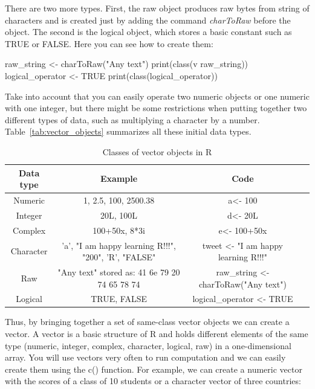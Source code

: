 There are two more types. First, the raw object produces raw bytes from string of characters and is created just by adding the command \emph{charToRaw} before the object. The second is the logical object, which stores a basic constant such as TRUE or FALSE. Here you can see how to create them:

\begin{exampler}
raw_string <- charToRaw("Any text")
print(class(v raw_string))
logical_operator <- TRUE 
print(class(logical_operator))
\end{exampler}

Take into account that you can easily operate two numeric objects or one numeric with one integer, but there might be some restrictions when putting together two different types of data, such as multiplying a character by a number. Table~\ref{tab:vector_objects} summarizes all these initial data types.

\begin{table}[ht]
\label{tab:vector_objects}
\caption{Classes of vector objects in R}
\centering
\begin{tabular}{c c c p{2cm}}
\hline\hline
Data type & Example & Code \\ [0.5ex]
\hline
Numeric&1, 2.5, 100, 2500.38& a\textless- 100 \\
Integer&20L, 100L&d\textless- 20L \\
Complex& 100+50x, 8*3i &e\textless- 100+50x \\
Character&   \parbox[t]{4cm}{\centering 'a', "I am happy learning R!!!", "200", 'R', "FALSE"} & tweet \textless- "I am happy learning R!!!" \\
Raw& \parbox[t]{4cm}{\centering "Any text" stored as:  41 6e 79 20 74 65 78 74} & raw\_string \textless- charToRaw("Any text") \\
Logical& TRUE, FALSE & logical\_operator \textless- TRUE  \\ [1ex]
\hline
\end{tabular}
\label{table:nonlin}
\end{table}

Thus, by bringing together a set of same-class vector objects we can create a vector. A vector is a basic structure of R and holds different elements of the same type (numeric, integer, complex, character, logical, raw) in a one-dimensional array.	You will use vectors very often to run computation and we can easily create them using the c() function. For example, we can create a numeric vector with the scores of a class of 10 students or a character vector of three countries:

